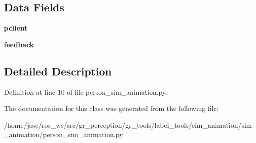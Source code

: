 \subsection*{Data Fields}
\begin{DoxyCompactItemize}
\item 
\mbox{\label{classsim__animation_1_1sim__animation_1_1person__sim__animation_1_1PersonSimAnimation_abb86a777c5d8d57b1c40acb5faff74ca}} 
{\bfseries pclient}
\item 
\mbox{\label{classsim__animation_1_1sim__animation_1_1person__sim__animation_1_1PersonSimAnimation_aa9166c4ee733578f7e98f50f66ac6445}} 
{\bfseries feedback}
\end{DoxyCompactItemize}


\subsection{Detailed Description}


Definition at line 10 of file person\+\_\+sim\+\_\+animation.\+py.



The documentation for this class was generated from the following file\+:\begin{DoxyCompactItemize}
\item 
/home/jose/ros\+\_\+ws/src/gr\+\_\+perception/gr\+\_\+tools/label\+\_\+tools/sim\+\_\+animation/sim\+\_\+animation/person\+\_\+sim\+\_\+animation.\+py\end{DoxyCompactItemize}
